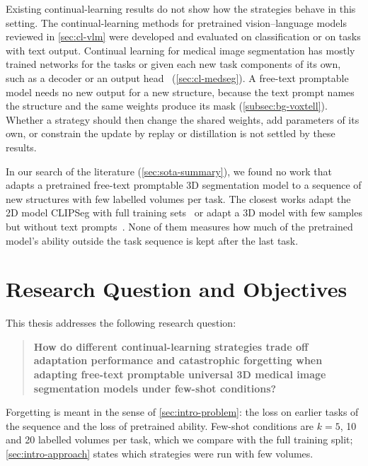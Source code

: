 Existing continual-learning results do not show how the strategies behave in this setting.
The continual-learning methods for pretrained vision--language models reviewed in \cref{sec:cl-vlm} were developed and evaluated on classification or on tasks with text output.
Continual learning for medical image segmentation has mostly trained networks for the tasks or given each new task components of its own, such as a decoder or an output head~\cite{ji2023continualsegmentsingleunified,guo2025continuallearningdrivenmodelaccurate,zhang2023continuallearningabdominalmultiorgan,ye2025medseqft} (\cref{sec:cl-medseg}).
A free-text promptable model needs no new output for a new structure, because the text prompt names the structure and the same weights produce its mask (\cref{subsec:bg-voxtell}).
Whether a strategy should then change the shared weights, add parameters of its own, or constrain the update by replay or distillation is not settled by these results.

In our search of the literature (\cref{sec:sota-summary}), we found no work that adapts a pretrained free-text promptable 3D segmentation model to a sequence of new structures with few labelled volumes per task.
The closest works adapt the 2D model CLIPSeg with full training sets~\cite{gao2026medcrpcl,gao2025paewc,gao2026medpeftcl} or adapt a 3D model with few samples but without text prompts~\cite{chen2026fewshotcontinuallearning3d}.
None of them measures how much of the pretrained model's ability outside the task sequence is kept after the last task.

\section{Research Question and Objectives}
\label{sec:intro-rq}

This thesis addresses the following research question:
\begin{quote}
\textbf{How do different continual-learning strategies trade off adaptation performance and catastrophic forgetting when adapting free-text promptable universal 3D medical image segmentation models under few-shot conditions?}
\end{quote}
Forgetting is meant in the sense of \cref{sec:intro-problem}: the loss on earlier tasks of the sequence and the loss of pretrained ability.
Few-shot conditions are $k = 5$, 10 and 20 labelled volumes per task, which we compare with the full training split; \cref{sec:intro-approach} states which strategies were run with few volumes.

